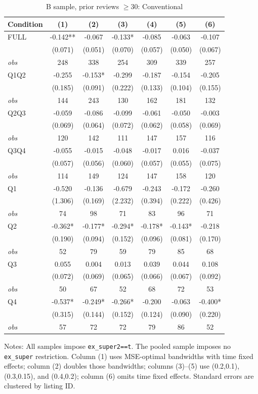 \begin{table}[!htbp]
\centering
\caption{B sample, prior reviews $\geq30$: Conventional}
\begin{tabular}{lcccccc}
\toprule
Condition & (1) & (2) & (3) & (4) & (5) & (6) \\
\midrule
FULL & -0.142** & -0.067 & -0.133* & -0.085 & -0.063 & -0.107 \\
 & (0.071) & (0.051) & (0.070) & (0.057) & (0.050) & (0.067) \\
\textit{obs} & 248 & 338 & 254 & 309 & 339 & 257 \\
Q1Q2 & -0.255 & -0.153* & -0.299 & -0.187 & -0.154 & -0.205 \\
 & (0.185) & (0.091) & (0.222) & (0.133) & (0.104) & (0.155) \\
\textit{obs} & 144 & 243 & 130 & 162 & 181 & 132 \\
Q2Q3 & -0.059 & -0.086 & -0.099 & -0.061 & -0.050 & -0.003 \\
 & (0.069) & (0.064) & (0.072) & (0.062) & (0.058) & (0.069) \\
\textit{obs} & 120 & 142 & 111 & 147 & 157 & 116 \\
Q3Q4 & -0.055 & -0.015 & -0.048 & -0.017 & 0.016 & -0.037 \\
 & (0.057) & (0.056) & (0.060) & (0.057) & (0.055) & (0.075) \\
\textit{obs} & 114 & 149 & 124 & 147 & 158 & 120 \\
Q1 & -0.520 & -0.136 & -0.679 & -0.243 & -0.172 & -0.260 \\
 & (1.306) & (0.169) & (2.232) & (0.394) & (0.222) & (0.426) \\
\textit{obs} & 74 & 98 & 71 & 83 & 96 & 71 \\
Q2 & -0.362* & -0.177* & -0.294* & -0.178* & -0.143* & -0.218 \\
 & (0.190) & (0.094) & (0.152) & (0.096) & (0.081) & (0.170) \\
\textit{obs} & 52 & 79 & 59 & 79 & 85 & 68 \\
Q3 & 0.055 & 0.004 & 0.013 & 0.039 & 0.044 & 0.108 \\
 & (0.072) & (0.069) & (0.065) & (0.066) & (0.067) & (0.092) \\
\textit{obs} & 50 & 67 & 52 & 68 & 72 & 53 \\
Q4 & -0.537* & -0.249* & -0.266* & -0.200 & -0.063 & -0.400* \\
 & (0.315) & (0.144) & (0.152) & (0.124) & (0.090) & (0.220) \\
\textit{obs} & 57 & 72 & 72 & 79 & 86 & 52 \\
\bottomrule
\end{tabular}
\begin{minipage}{0.98\textwidth}\footnotesize
Notes: All samples impose \texttt{ex\_super2==t}. The pooled sample imposes no \texttt{ex\_super} restriction. Column (1) uses MSE-optimal bandwidths with time fixed effects; column (2) doubles those bandwidths; columns (3)--(5) use (0.2,0.1), (0.3,0.15), and (0.4,0.2); column (6) omits time fixed effects. Standard errors are clustered by listing ID.
\end{minipage}
\end{table}

